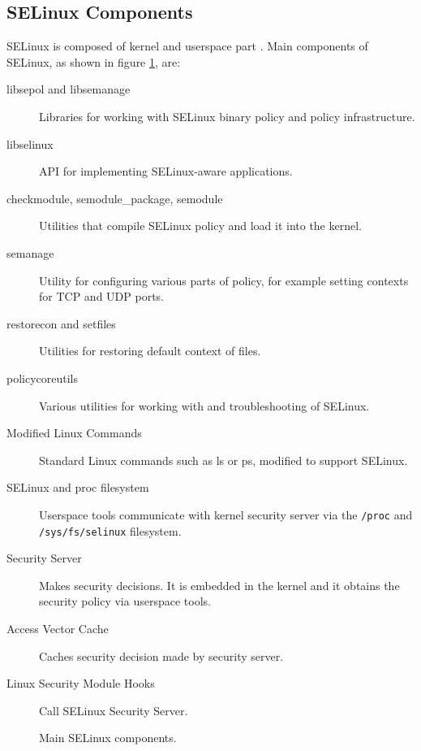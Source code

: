 \subsection{SELinux Components}
SELinux is composed of kernel and userspace part \cite[pp.~19--22]{tsn}. Main
components of SELinux, as shown in figure \ref{fig:selinuxcomponents}, are:
\begin{description}
    \item [libsepol and libsemanage] Libraries for working with SELinux binary
        policy and policy infrastructure.
    \item [libselinux] API for implementing SELinux-aware applications.
    \item [checkmodule, semodule\_package, semodule] Utilities that compile
        SELinux policy and load it into the kernel.
    \item [semanage] Utility for configuring various parts of policy, for
        example setting contexts for TCP and UDP ports.
    \item [restorecon and setfiles] Utilities for restoring default context of
        files.
    \item [policycoreutils] Various utilities for working with and
        troubleshooting of SELinux.
    \item [Modified Linux Commands] Standard Linux commands such as ls or ps,
        modified to support SELinux.
    \item [SELinux and proc filesystem] Userspace tools communicate with kernel
        security server via the \texttt{/proc} and \texttt{/sys/fs/selinux}
        filesystem.
    \item [Security Server] Makes security decisions. It is embedded in the
        kernel and it obtains the security policy via userspace tools.
    \item [Access Vector Cache] Caches security decision made by security
        server.
    \item [Linux Security Module Hooks] Call SELinux Security Server.
\end{description}

\begin{figure}
    \centering
    \label{fig:selinuxcomponents}
    
    \caption{Main SELinux components.}
\end{figure}

